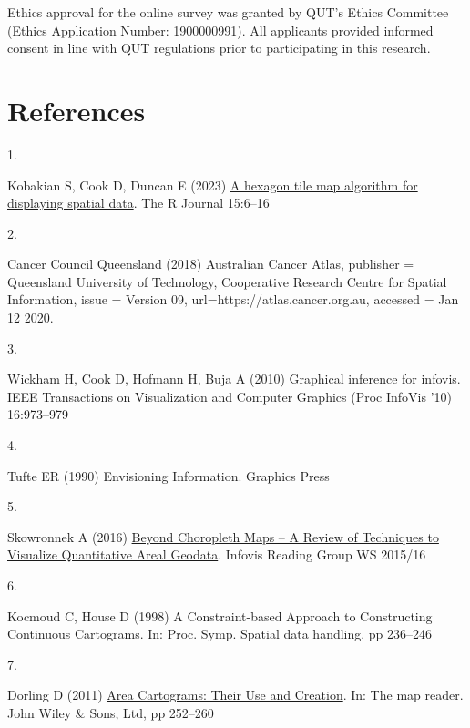 \documentclass[
]{article}
\newlength{\cslhangindent}
\newlength{\csllabelwidth}
\newenvironment{CSLReferences}[2] %
 {\begin{list}{}{%
  \setlength{\itemindent}{0pt}
  \setlength{\leftmargin}{0pt}
  \setlength{\parsep}{0pt}
  \ifodd #1
   \setlength{\leftmargin}{\cslhangindent}
   \setlength{\itemindent}{-1\cslhangindent}
  \fi
  \setlength{\itemsep}{#2\baselineskip}}}
 {\end{list}}
\newcommand{\CSLLeftMargin}[1]{\parbox[t]{\csllabelwidth}{\strut#1\strut}}
\newcommand{\CSLRightInline}[1]{\parbox[t]{\linewidth - \csllabelwidth}{\strut#1\strut}}
\begin{document}
Ethics approval for the online survey was granted by QUT's Ethics
Committee (Ethics Application Number: 1900000991). All applicants
provided informed consent in line with QUT regulations prior to
participating in this research.

\section*{References}\label{references}

\label{refs}
\begin{CSLReferences}{0}{1}
\CSLLeftMargin{1. }%
\CSLRightInline{Kobakian S, Cook D, Duncan E (2023)
\href{https://doi.org/10.32614/RJ-2023-021}{A hexagon tile map algorithm
for displaying spatial data}. The R Journal 15:6--16}

\CSLLeftMargin{2. }%
\CSLRightInline{Cancer Council Queensland (2018) {Australian Cancer
Atlas}, publisher = {Queensland University of Technology, Cooperative
Research Centre for Spatial Information}, issue = {Version 09},
url={https://atlas.cancer.org.au}, accessed = {Jan 12 2020}. }

\CSLLeftMargin{3. }%
\CSLRightInline{Wickham H, Cook D, Hofmann H, Buja A (2010) Graphical
inference for infovis. IEEE Transactions on Visualization and Computer
Graphics (Proc InfoVis '10) 16:973--979}

\CSLLeftMargin{4. }%
\CSLRightInline{Tufte ER (1990) {Envisioning Information}. Graphics
Press}

\CSLLeftMargin{5. }%
\CSLRightInline{Skowronnek A (2016)
\href{https://alsino.io/static/papers/BeyondChoropleths_AlsinoSkowronnek.pdf}{{Beyond
Choropleth Maps -- A Review of Techniques to Visualize Quantitative
Areal Geodata}}. {Infovis Reading Group WS 2015/16} }

\CSLLeftMargin{6. }%
\CSLRightInline{Kocmoud C, House D (1998) {A Constraint-based Approach
to Constructing Continuous Cartograms}. In: Proc. Symp. Spatial data
handling. pp 236--246}

\CSLLeftMargin{7. }%
\CSLRightInline{Dorling D (2011)
\href{https://doi.org/10.1002/9780470979587.ch33}{{Area Cartograms:
Their Use and Creation}}. In: The map reader. John Wiley \& Sons, Ltd,
pp 252--260}


\end{CSLReferences}
\end{document}
